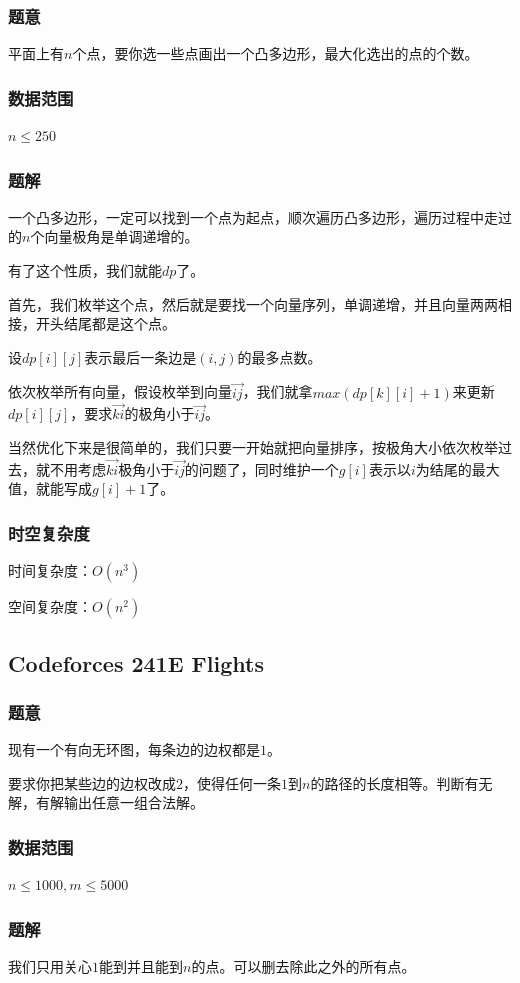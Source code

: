 \documentclass{ctexart}
\begin{document}
\subsubsection{题意}
平面上有$n$个点，要你选一些点画出一个凸多边形，最大化选出的点的个数。
\subsubsection{数据范围}
$n \le 250$
\subsubsection{题解}
一个凸多边形，一定可以找到一个点为起点，顺次遍历凸多边形，遍历过程中走过的$n$个向量极角是单调递增的。

有了这个性质，我们就能$dp$了。

首先，我们枚举这个点，然后就是要找一个向量序列，单调递增，并且向量两两相接，开头结尾都是这个点。

设$dp[i][j]$表示最后一条边是$(i,j)$的最多点数。

依次枚举所有向量，假设枚举到向量$\overrightarrow{ij}$，我们就拿$max(dp[k][i]+1)$来更新$dp[i][j]$，要求$\overrightarrow{ki}$的极角小于$\overrightarrow{ij}$。

当然优化下来是很简单的，我们只要一开始就把向量排序，按极角大小依次枚举过去，就不用考虑$\overrightarrow{ki}$极角小于$\overrightarrow{ij}$的问题了，同时维护一个$g[i]$表示以$i$为结尾的最大值，就能写成$g[i]+1$了。
\subsubsection{时空复杂度}
时间复杂度：$O(n^3)$

空间复杂度：$O(n^2)$
\subsection{Codeforces 241E Flights}
\subsubsection{题意}
现有一个有向无环图，每条边的边权都是$1$。

要求你把某些边的边权改成$2$，使得任何一条$1$到$n$的路径的长度相等。判断有无解，有解输出任意一组合法解。
\subsubsection{数据范围}
$n \le 1000,m \le 5000$
\subsubsection{题解}
我们只用关心$1$能到并且能到$n$的点。可以删去除此之外的所有点。
\end{document}

